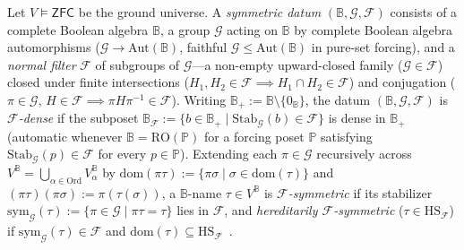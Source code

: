 \begin{definition}\label{def:symmetric-bv-submodel}%
%
Let $V \models \mathsf{ZFC}$ be the ground universe. A \emph{symmetric datum} $(\mathbb{B}, \mathcal{G}, \mathcal{F})$ consists of a complete Boolean algebra $\mathbb{B}$, a group $\mathcal{G}$ acting on $\mathbb{B}$ by complete Boolean algebra automorphisms ($\mathcal{G} \to \mathrm{Aut}(\mathbb{B})$, faithful $\mathcal{G} \le \mathrm{Aut}(\mathbb{B})$ in pure-set forcing), and a \emph{normal filter} $\mathcal{F}$ of subgroups of $\mathcal{G}$---a non-empty upward-closed family ($\mathcal{G} \in \mathcal{F}$) closed under finite intersections ($H_1, H_2 \in \mathcal{F} \implies H_1 \cap H_2 \in \mathcal{F}$) and conjugation ($\pi \in \mathcal{G},\, H \in \mathcal{F} \implies \pi H \pi^{-1} \in \mathcal{F}$). Writing $\mathbb{B}_+ := \mathbb{B} \setminus \{0_{\mathbb{B}}\}$, the datum $(\mathbb{B}, \mathcal{G}, \mathcal{F})$ is \emph{$\mathcal{F}$-dense} if the subposet $\mathbb{B}_{\mathcal{F}} := \{b \in \mathbb{B}_+ \mid \mathrm{Stab}_{\mathcal{G}}(b) \in \mathcal{F}\}$ is dense in $\mathbb{B}_+$ (automatic whenever $\mathbb{B} = \mathrm{RO}(\mathbb{P})$ for a forcing poset $\mathbb{P}$ satisfying $\mathrm{Stab}_{\mathcal{G}}(p) \in \mathcal{F}$ for every $p \in \mathbb{P}$). Extending each $\pi \in \mathcal{G}$ recursively across $V^{\mathbb{B}} = \bigcup_{\alpha \in \mathrm{Ord}} V^{\mathbb{B}}_\alpha$ by $\mathrm{dom}(\pi\tau) := \{\pi\sigma \mid \sigma \in \mathrm{dom}(\tau)\}$ and $(\pi\tau)(\pi\sigma) := \pi(\tau(\sigma))$, a $\mathbb{B}$-name $\tau \in V^{\mathbb{B}}$ is \emph{$\mathcal{F}$-symmetric} if its stabilizer $\mathrm{sym}_{\mathcal{G}}(\tau) := \{\pi \in \mathcal{G} \mid \pi\tau = \tau\}$ lies in $\mathcal{F}$, and \emph{hereditarily $\mathcal{F}$-symmetric} ($\tau \in \mathrm{HS}_{\mathcal{F}}$) if $\mathrm{sym}_{\mathcal{G}}(\tau) \in \mathcal{F}$ and $\mathrm{dom}(\tau) \subseteq \mathrm{HS}_{\mathcal{F}}$~\cite[\S 5.2]{Jech73}.
\end{definition}

